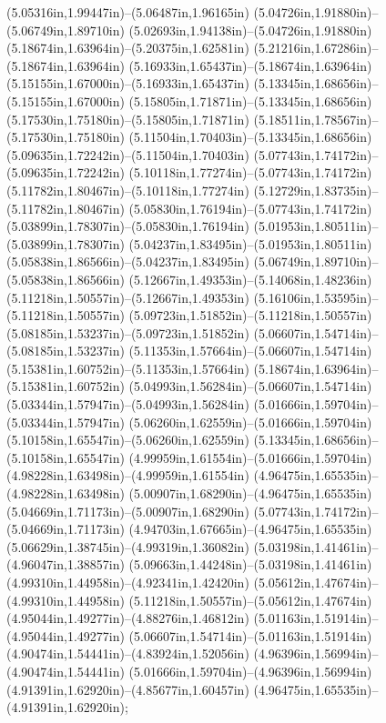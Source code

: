 (5.05316in,1.99447in)--(5.06487in,1.96165in) (5.04726in,1.91880in)--(5.06749in,1.89710in) (5.02693in,1.94138in)--(5.04726in,1.91880in) (5.18674in,1.63964in)--(5.20375in,1.62581in) (5.21216in,1.67286in)--(5.18674in,1.63964in) (5.16933in,1.65437in)--(5.18674in,1.63964in) (5.15155in,1.67000in)--(5.16933in,1.65437in) (5.13345in,1.68656in)--(5.15155in,1.67000in) (5.15805in,1.71871in)--(5.13345in,1.68656in) (5.17530in,1.75180in)--(5.15805in,1.71871in) (5.18511in,1.78567in)--(5.17530in,1.75180in) (5.11504in,1.70403in)--(5.13345in,1.68656in) (5.09635in,1.72242in)--(5.11504in,1.70403in) (5.07743in,1.74172in)--(5.09635in,1.72242in) (5.10118in,1.77274in)--(5.07743in,1.74172in) (5.11782in,1.80467in)--(5.10118in,1.77274in) (5.12729in,1.83735in)--(5.11782in,1.80467in) (5.05830in,1.76194in)--(5.07743in,1.74172in) (5.03899in,1.78307in)--(5.05830in,1.76194in) (5.01953in,1.80511in)--(5.03899in,1.78307in) (5.04237in,1.83495in)--(5.01953in,1.80511in) (5.05838in,1.86566in)--(5.04237in,1.83495in) (5.06749in,1.89710in)--(5.05838in,1.86566in) (5.12667in,1.49353in)--(5.14068in,1.48236in) (5.11218in,1.50557in)--(5.12667in,1.49353in) (5.16106in,1.53595in)--(5.11218in,1.50557in) (5.09723in,1.51852in)--(5.11218in,1.50557in) (5.08185in,1.53237in)--(5.09723in,1.51852in) (5.06607in,1.54714in)--(5.08185in,1.53237in) (5.11353in,1.57664in)--(5.06607in,1.54714in) (5.15381in,1.60752in)--(5.11353in,1.57664in) (5.18674in,1.63964in)--(5.15381in,1.60752in) (5.04993in,1.56284in)--(5.06607in,1.54714in) (5.03344in,1.57947in)--(5.04993in,1.56284in) (5.01666in,1.59704in)--(5.03344in,1.57947in) (5.06260in,1.62559in)--(5.01666in,1.59704in) (5.10158in,1.65547in)--(5.06260in,1.62559in) (5.13345in,1.68656in)--(5.10158in,1.65547in) (4.99959in,1.61554in)--(5.01666in,1.59704in) (4.98228in,1.63498in)--(4.99959in,1.61554in) (4.96475in,1.65535in)--(4.98228in,1.63498in) (5.00907in,1.68290in)--(4.96475in,1.65535in) (5.04669in,1.71173in)--(5.00907in,1.68290in) (5.07743in,1.74172in)--(5.04669in,1.71173in) (4.94703in,1.67665in)--(4.96475in,1.65535in) (5.06629in,1.38745in)--(4.99319in,1.36082in) (5.03198in,1.41461in)--(4.96047in,1.38857in) (5.09663in,1.44248in)--(5.03198in,1.41461in) (4.99310in,1.44958in)--(4.92341in,1.42420in) (5.05612in,1.47674in)--(4.99310in,1.44958in) (5.11218in,1.50557in)--(5.05612in,1.47674in) (4.95044in,1.49277in)--(4.88276in,1.46812in) (5.01163in,1.51914in)--(4.95044in,1.49277in) (5.06607in,1.54714in)--(5.01163in,1.51914in) (4.90474in,1.54441in)--(4.83924in,1.52056in) (4.96396in,1.56994in)--(4.90474in,1.54441in) (5.01666in,1.59704in)--(4.96396in,1.56994in) (4.91391in,1.62920in)--(4.85677in,1.60457in) (4.96475in,1.65535in)--(4.91391in,1.62920in);
